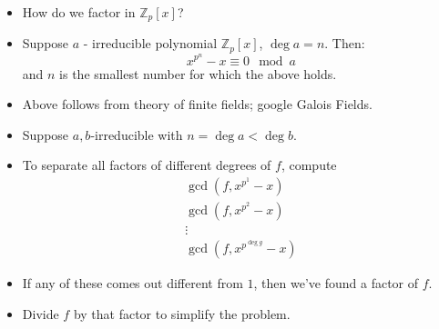 \begin{frame}
\begin{itemize}
\item How do we factor in $\mathbb Z_p[x]$?
\item<2-> Suppose $a$ - irreducible polynomial $\mathbb Z_p[x]$, $\deg a=n$.  Then:
\[
x^{p^n}-x \equiv 0 \mod a
\]
and $n$ is the smallest number for which the above holds. 

\item<4-> Above follows from theory of finite fields; google Galois Fields.
\item<5-> Suppose $a,b$-irreducible with $n=\deg a<\deg b$. 
\item<7-> To separate all factors of different degrees of $f$, compute 
\[
\begin{array}{c}
\gcd(f, x^{p^{1}}-x)\\
\gcd(f, x^{p^{2}}-x)\\
\vdots\\
\gcd(f, x^{p^{\deg g}}- x)
\end{array}
\]
\item<8-> If any of these comes out different from $1$, then we've found a factor of $f$. 
\item<9-> Divide $f$ by that factor to simplify the problem.
\end{itemize}

\end{frame}
